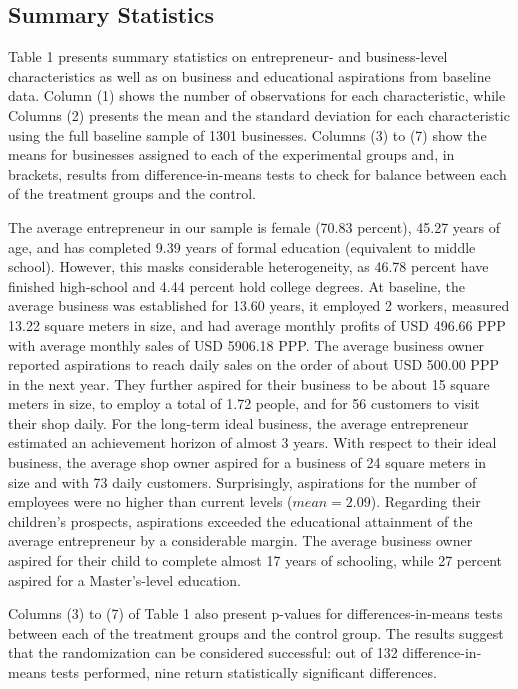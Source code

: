 \documentclass[11.5pt]{article}
\begin{document}
\subsection{Summary Statistics}

Table 1 presents summary statistics on entrepreneur- and business-level characteristics as well as on business and educational aspirations from baseline data. Column (1) shows the number of observations for each characteristic, while Columns (2) presents the mean and the standard deviation for each characteristic using the full baseline sample of 1301 businesses. Columns (3) to (7) show the means for businesses assigned to each of the experimental groups and, in brackets, results from difference-in-means tests to check for balance between each of the treatment groups and the control.

The average entrepreneur in our sample is female (70.83 percent), 45.27 years of age, and has completed 9.39 years of formal education (equivalent to middle school). However, this masks considerable heterogeneity, as 46.78 percent have finished high-school and 4.44 percent hold college degrees. At baseline, the average business was established for 13.60 years, it employed 2 workers, measured 13.22 square meters in size, and had average monthly profits of USD 496.66 PPP with average monthly sales of USD 5906.18 PPP. The average business owner reported aspirations to reach daily sales on the order of about USD 500.00 PPP in the next year. They further aspired for their business to be about 15 square meters in size, to employ a total of 1.72 people, and for 56 customers to visit their shop daily. For the long-term ideal business, the average entrepreneur estimated an achievement horizon of almost 3 years. With respect to their ideal business, the average shop owner aspired for a business of 24 square meters in size and with 73 daily customers. Surprisingly, aspirations for the number of employees were no higher than current levels ($mean = 2.09$). Regarding their children's prospects, aspirations exceeded the educational attainment of the average entrepreneur by a considerable margin. The average business owner aspired for their child to complete almost 17 years of schooling, while 27 percent aspired for a Master's-level education.

Columns (3) to (7) of Table 1 also present p-values for differences-in-means tests between each of the treatment groups and the control group. The results suggest that the randomization can be considered successful: out of 132 difference-in-means tests performed, nine return statistically significant differences.
\end{document}
